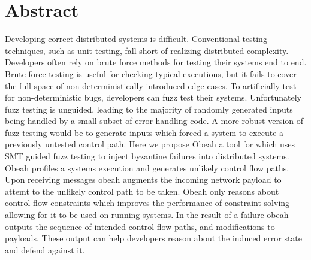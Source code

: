 \section{Abstract}
\label{sec:abstract}

Developing correct distributed systems is difficult. Conventional testing
techniques, such as unit testing, fall short of realizing distributed
complexity. Developers often rely on brute force methods for testing their
systems end to end. Brute force testing is useful for checking typical
executions, but it fails to cover the full space of non-deterministically
introduced edge cases. To artificially test for non-deterministic bugs,
developers can fuzz test their systems.  Unfortunately fuzz testing is
unguided, leading to the majority of randomly generated inputs being handled by
a small subset of error handling code. A more robust version of fuzz testing
would be to generate inputs which forced a system to execute a previously
untested control path. Here we propose Obeah a tool for which uses SMT guided
fuzz testing to inject byzantine failures into distributed systems. Obeah
profiles a systems execution and generates unlikely control flow paths. Upon
receiving messages obeah augments the incoming network payload to attemt to the
unlikely control path to be taken. Obeah only reasons about control flow
constraints which improves the performance of constraint solving allowing for
it to be used on running systems. In the result of a failure obeah outputs the
sequence of intended control flow paths, and modifications to payloads. These
output can help developers reason about the induced error state and defend
against it.



